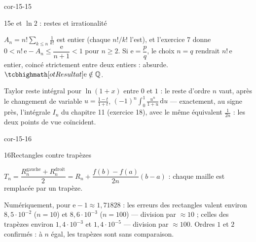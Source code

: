 \begin{blocLivre}{cor-15-15}
\begin{corrige}{15}{$\mathrm{e}$ et $\ln2$ : restes et irrationalité}
\begin{questions}
  \item $A_n=n!\sum_{k\leqslant n}\frac{1}{k!}$ est entier (chaque
    $n!/k!$ l'est), et l'exercice 7 donne
    $0<n!\,\mathrm{e}-A_n\leqslant\dfrac{\mathrm{e}}{n+1}<1$ pour
    $n\geqslant2$. Si $\mathrm{e}=\dfrac pq$, le choix $n=q$ rendrait
    $n!\,\mathrm{e}$ entier, coincé strictement entre deux entiers :
    absurde. $\res{\mathrm{e}\notin\Q}$.
  \item Taylor reste intégral pour $\ln(1+x)$ entre $0$ et $1$ : le reste
    d'ordre $n$ vaut, après le changement de variable
    $u=\frac{1-t}{1+t}$,
    $(-1)^{n}\displaystyle\int_{0}^{1}\frac{u^{n}}{1+u}\,\mathrm{d}u$ —
    exactement, au signe près, l'intégrale $I_n$ du chapitre 11
    (exercice 18), avec le même équivalent $\frac{1}{2n}$ : les deux
    points de vue coïncident.
\end{questions}
\end{corrige}
\end{blocLivre}

\begin{blocLivre}{cor-15-16}
\begin{corrige}{16}{Rectangles contre trapèzes}
\begin{questions}
  \item $T_n=\dfrac{R_n^{\text{gauche}}+R_n^{\text{droit}}}{2}
    =R_n+\dfrac{f(b)-f(a)}{2n}(b-a)$ : chaque maille est remplacée par un
    trapèze.
  \item Numériquement, pour $\mathrm{e}-1\approx1{,}71828$ :
    les erreurs des rectangles valent environ $8{,}5\cdot10^{-2}$
    ($n=10$) et $8{,}6\cdot10^{-3}$ ($n=100$) — division par $\approx10$ ;
    celles des trapèzes environ $1{,}4\cdot10^{-3}$ et
    $1{,}4\cdot10^{-5}$ — division par $\approx100$. Ordres $1$ et $2$
    confirmés : à $n$ égal, les trapèzes sont sans comparaison.
\end{questions}
\end{corrige}
\end{blocLivre}

